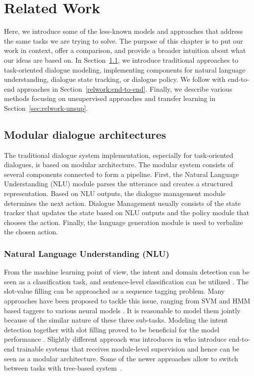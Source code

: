 \chapter{Related Work}%
\label{chap:related}
\label{sec:relwork}
Here, we introduce some of the less-known models and approaches that address the same tasks we are trying to solve.
The purpose of this chapter is to put our work in context, offer a comparison, and provide a broader intuition about what our ideas are based on.
In Section~\ref{relwork:modular}, we introduce traditional approaches to task-oriented dialogue modeling, implementing components for natural language understanding, dialogue state tracking, or dialogue policy.
We follow with end-to-end approaches in Section~\ref{relwork:end-to-end}.
Finally, we describe various methods focusing on unsupervised approaches and transfer learning in Section~\ref{sec:relwork-unsup}.
\section{Modular dialogue architectures}
\label{relwork:modular}
The traditional dialogue system implementation, especially for task-oriented dialogues, is based on modular architecture.
The modular system consists of several components connected to form a pipeline.
First, the Natural Language Understanding (NLU) module parses the utterance and creates a structured representation.
Based on NLU outputs, the dialogue management module determines the next action.
Dialogue Management usually consists of the state tracker that updates the state based on NLU outputs and the policy module that chooses the action.
Finally, the language generation module is used to verbalize the chosen action.
\subsection{Natural Language Understanding (NLU)}
From the machine learning point of view, the intent and domain detection can be seen as a classification task, and sentence-level classification can be utilized \cite{yaman2008integrative,schapire2000boostexter}.
The slot-value filling can be approached as a sequence tagging problem.
Many approaches have been proposed to tackle this issue, ranging from SVM \cite{shi2016recurrent} and HMM \cite{surendran2006dialog} based taggers to various neural models \cite{adel2016comparing, zhang2017position, mesnil2014using}.
It is reasonable to model them jointly because of the similar nature of these three sub-tasks.
Modeling the intent detection together with slot filling proved to be beneficial for the model performance \cite{zhang2017position, liu2016attention, xu2013convolutional}.
Slightly different approach was introduces in \citet{DBLP:conf/aaai/LiangTCY20} who introduce end-to-end trainable systems that receives module-level supervision and hence can be seen as a modular architecture.
Some of the newer approaches allow to switch between tasks with tree-based system~\cite{xie2022converse}.

